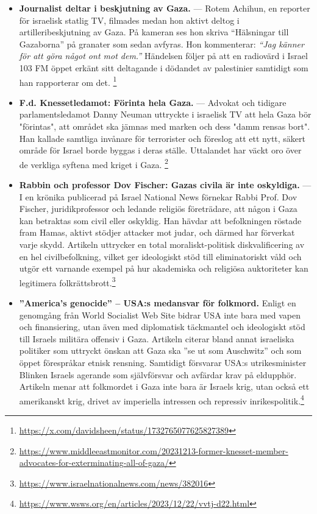 \begin{itemize}
\item \textbf{Journalist deltar i beskjutning av Gaza.} — Rotem Achihun, en reporter för israelisk statlig TV, filmades medan hon aktivt deltog i artilleribeskjutning av Gaza. På kameran ses hon skriva “Hälsningar till Gazaborna” på granater som sedan avfyras. Hon kommenterar: \textit{“Jag känner för att göra något ont mot dem.”} Händelsen följer på att en radiovärd i Israel 103 FM öppet erkänt sitt deltagande i dödandet av palestinier samtidigt som han rapporterar om det. \footnote{\url{https://x.com/davidsheen/status/1732765077625827389}}

\item \textbf{F.d. Knessetledamot: Förinta hela Gaza.} — Advokat och tidigare parlamentsledamot Danny Neuman uttryckte i israelisk TV att hela Gaza bör "förintas", att området ska jämnas med marken och dess "damm rensas bort". Han kallade samtliga invånare för terrorister och föreslog att ett nytt, säkert område för Israel borde byggas i deras ställe. Uttalandet har väckt oro över de verkliga syftena med kriget i Gaza. \footnote{\url{https://www.middleeastmonitor.com/20231213-former-knesset-member-advocates-for-exterminating-all-of-gaza/}}

\item \textbf{Rabbin och professor Dov Fischer: Gazas civila är inte oskyldiga.} — I en krönika publicerad på Israel National News förnekar Rabbi Prof. Dov Fischer, juridikprofessor och ledande religiös företrädare, att någon i Gaza kan betraktas som civil eller oskyldig. Han hävdar att befolkningen röstade fram Hamas, aktivt stödjer attacker mot judar, och därmed har förverkat varje skydd. Artikeln uttrycker en total moraliskt-politisk diskvalificering av en hel civilbefolkning, vilket ger ideologiskt stöd till eliminatoriskt våld och utgör ett varnande exempel på hur akademiska och religiösa auktoriteter kan legitimera folkrättsbrott.\footnote{\url{https://www.israelnationalnews.com/news/382016}}

\item \textbf{”America’s genocide” – USA:s medansvar för folkmord.} Enligt en genomgång från World Socialist Web Site bidrar USA inte bara med vapen och finansiering, utan även med diplomatisk täckmantel och ideologiskt stöd till Israels militära offensiv i Gaza. Artikeln citerar bland annat israeliska politiker som uttryckt önskan att Gaza ska ”se ut som Auschwitz” och som öppet förespråkar etnisk rensning. Samtidigt försvarar USA:s utrikesminister Blinken Israels agerande som självförsvar och avfärdar krav på eldupphör. Artikeln menar att folkmordet i Gaza inte bara är Israels krig, utan också ett amerikanskt krig, drivet av imperiella intressen och repressiv inrikespolitik.\footnote{\url{https://www.wsws.org/en/articles/2023/12/22/vvtj-d22.html}}


\end{itemize}
